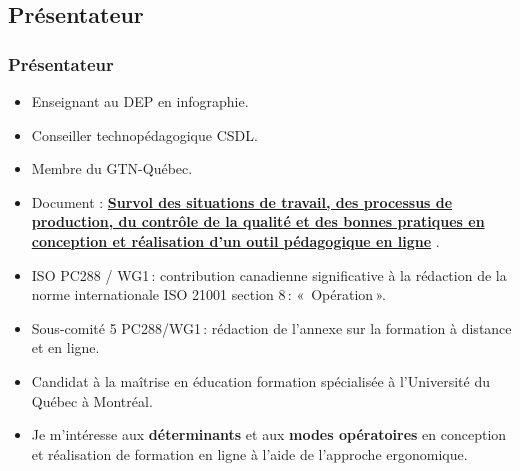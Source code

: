		
	\subsection{Présentateur} 
		\begin{frame}[allowframebreaks]
			\frametitle{Présentateur}
			\begin {itemize}
				
                                \item Enseignant au DEP en  infographie.
                                \item Conseiller technopédagogique CSDL.
                                \item Membre du GTN-Québec.
                                \item Document : {\href{https://www.dropbox.com/s/22eg15w44mpo5dj/Rapport\%20GTN\%20Final.docx?dl=0}{\textbf{Survol des situations de travail, des processus de production, du contrôle de la qualité et des bonnes pratiques en conception et réalisation d’un outil pédagogique en ligne}}} .  
                                \framebreak
                                \item ISO PC288 / WG1\,: contribution canadienne significative à la rédaction de la norme internationale ISO 21001 section 8\,: «\, Opération\,».
                                \item Sous-comité 5 PC288/WG1\,: rédaction de l’annexe sur la formation à distance et en ligne.
                                \framebreak
                                \item Candidat à la maîtrise en éducation formation spécialisée à l'Université du Québec à Montréal.
                                \item Je m'intéresse aux \textbf{déterminants} et aux \textbf{modes opératoires} en conception et réalisation de formation en ligne à l’aide de l’approche ergonomique.



			\end{itemize}
		\end{frame}
			
